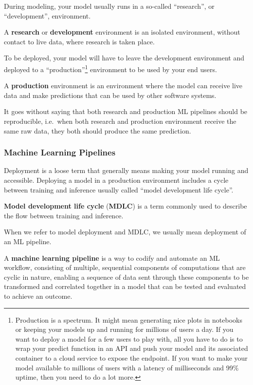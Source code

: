 During modeling, your model usually runs in a so-called ``research'', or ``development'', environment.

A \textbf{research} or \textbf{development} environment is an isolated environment, without contact to live data, where
research is taken place.
\ed

To be deployed, your model will have to leave the development environment and deployed to a ``production''\footnote{
Production is a spectrum. It might mean generating nice plots in notebooks or keeping your models up and running for
millions of users a day. If you want to deploy a model for a few users to play with, all you have to do is to wrap
your predict function in an API and push your model and its associated container to a cloud service to expose the
endpoint. If you want to make your model available to millions of users with a latency of milliseconds and 99\% uptime,
then you need to do a lot more.} environment to be used by your end users.

A \textbf{production} environment is an environment where the model can receive live data and make predictions that can
be used by other software systems.
\ed

It goes without saying that both research and production ML pipelines should be reproducible, i.e.\ when
both research and production environment receive the same raw data, they both should produce the same prediction.

\subsubsection{Machine Learning Pipelines}

Deployment is a loose term that generally means making your model running and accessible. Deploying a model in a
production environment includes a cycle between training and inference usually called ``model development life cycle''.

\textbf{Model development life cycle} (\textbf{MDLC}) is a term commonly used to describe the flow between training and
inference.
\ed


When we refer to model deployment and MDLC, we usually mean deployment of an ML pipeline.

A \textbf{machine learning pipeline} is a way to codify and automate an ML workflow, consisting of multiple, sequential
components of computations that are cyclic in nature, enabling a sequence of data sent through these components to be
transformed and correlated together in a model that can be tested and evaluated to achieve an outcome.
\ed

